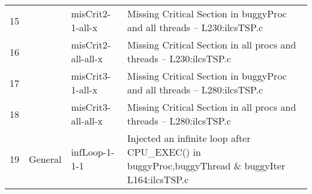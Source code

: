 \begin{table*}[]
{\begin{tabular}{|c|c|l|l|}
15 &  & misCrit2-1-all-x & Missing Critical Section in buggyProc and all threads -- L230:ilcsTSP.c \\ \cline{1-1} \cline{3-4}
16 &  & misCrit2-all-all-x & Missing Critical Section in all procs and threads -- L230:ilcsTSP.c \\ \cline{1-1} \cline{3-4}
17 &  & misCrit3-1-all-x & Missing Critical Section in buggyProc and all threads -- L280:ilcsTSP.c \\ \cline{1-1} \cline{3-4}
18 &  & misCrit3-all-all-x & Missing Critical Section in all procs and threads -- L280:ilcsTSP.c \\ \hline
19 & General & infLoop-1-1-1 & Injected an infinite loop after CPU\_EXEC() in buggyProc,buggyThread \& buggyIter L164:ilcsTSP.c \\ \hline
\end{tabular}
}
\end{table*}

